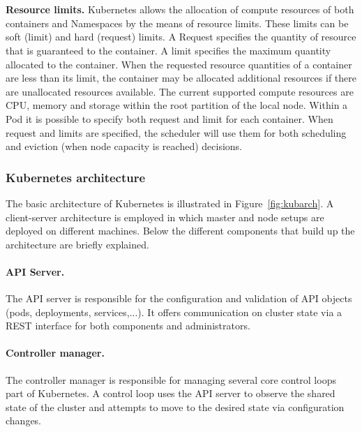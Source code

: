 \\\\
\textbf{Resource limits.}  Kubernetes allows the allocation of compute resources of both containers and Namespaces by the means of resource limits. These limits can be soft (limit) and hard (request) limits. A Request specifies the quantity of resource that is guaranteed to the container. A limit specifies the maximum quantity allocated to the container. When the requested resource quantities of a container are less than its limit, the container may be allocated additional resources if there are unallocated resources available.  The current supported compute resources are CPU, memory and storage within the root partition of the local node. Within a Pod it is possible to specify both request and limit for each container. When request and limits are specified, the scheduler will use them for both scheduling and eviction (when node capacity is reached) decisions.~\cite{kubresources}
\subsubsection{Kubernetes architecture}
The basic architecture of Kubernetes is illustrated in Figure~\ref{fig:kubarch}. A client-server architecture is employed in which master and node setups are deployed on different machines. Below the different components that build up the architecture are briefly explained. 
\paragraph{API Server.} The API server is responsible for the configuration and validation of API objects (pods, deployments, services,...). It offers communication on cluster state via a REST interface for both components and administrators.~\cite{kubernetes-api-server}
\paragraph{Controller manager.} The controller manager is responsible for managing several core control loops part of Kubernetes. A control loop uses the API server to observe the shared state of the cluster and attempts to move to the desired state via configuration changes.~\cite{kubernetes-controller-manager}
